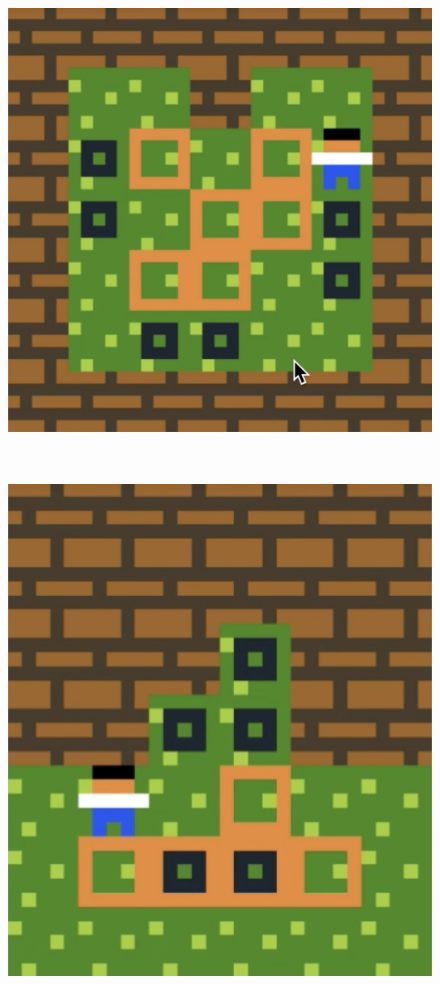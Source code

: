 \begin{figure}[!htbp]
\begin{minipage}[t]{0.2\textwidth}
\end{minipage}
$\:$
\begin{minipage}[t]{0.2\textwidth}
\includegraphics[width=\textwidth]{figures/finaldesign5_2.png} \hfill \\
\end{minipage}
$\:$
\begin{minipage}[t]{0.2\textwidth}
\includegraphics[width=\textwidth]{figures/finaldesign5_3.png} \hfill \\

\end{minipage}
\end{figure}

